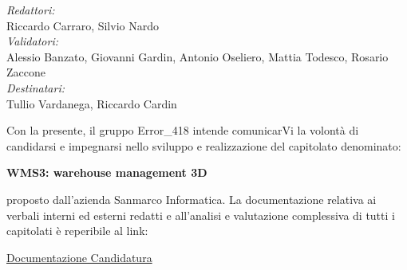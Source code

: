\documentclass[a4paper, twoside]{article}
\begin{document}
\begin{titlepage}
\vspace{0.5cm} %

\begin{center} %
\emph{\Large Redattori:}\\
\large{Riccardo Carraro, Silvio Nardo}\\
\vspace{1cm} %
\emph{\Large Validatori:}\\
\large{Alessio Banzato, Giovanni Gardin, Antonio Oseliero, Mattia Todesco, Rosario Zaccone}\\
\vspace{1cm} %
\emph{\Large Destinatari:}\\
\large{Tullio Vardanega, Riccardo Cardin}
\end{center}

\vfill %
\end{titlepage}
\newpage
Con la presente, il gruppo Error\_418 intende comunicarVi la volontà di candidarsi e impegnarsi nello sviluppo e realizzazione del capitolato denominato:
\begin{center}
\textbf{WMS3: warehouse management 3D}
\end{center}
proposto dall'azienda Sanmarco Informatica. La documentazione relativa ai verbali interni ed esterni redatti e all'analisi e valutazione complessiva di tutti i capitolati è reperibile al link: 
\begin{center}
\href{https://github.com/Error-418-SWE/Documenti/tree/main}{Documentazione Candidatura}
\end{center}
\end{document}
